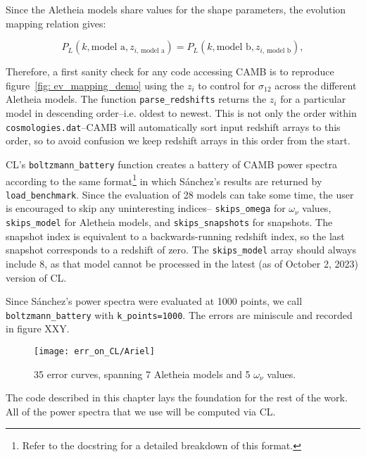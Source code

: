 Since the Aletheia models share values for the shape parameters, the
evolution mapping relation gives:

\begin{equation}
P_L(k, \text{model a}, z_{i, \, \text{model a}})
=
P_L(k, \text{model b}, z_{i, \, \text{model b}})
,\end{equation}

Therefore, a first sanity check for any code accessing CAMB is to reproduce
figure~\ref{fig: ev_mapping_demo} using the $z_i$ to control for $\sigma_{12}$
across the different Aletheia models. The function \verb|parse_redshifts|
returns the $z_i$ for a particular model in descending order--i.e. oldest
to newest. This is not only the order within \verb|cosmologies.dat|--CAMB
will automatically sort input redshift arrays to this order, so to avoid
confusion we keep redshift arrays in this order from the start.

CL's \verb|boltzmann_battery| function creates a battery of CAMB power
spectra according to the same
format\footnote{Refer to the docstring for a detailed breakdown of this
format.} in which S\'{a}nchez's results are
returned by \verb|load_benchmark|. Since the evaluation of 28 models can take
some time, the user is encouraged to skip any uninteresting indices--
\verb|skips_omega| for $\omega_\nu$ values, \verb|skips_model| for
Aletheia models, and \verb|skips_snapshots| for snapshots. The snapshot index
is equivalent to a backwards-running redshift index, so the last snapshot
corresponds to a redshift of zero. The \verb|skips_model| array should always
include 8, as that model cannot be processed in the latest (as of October 2,
2023) version of CL.

Since S\'{a}nchez's power spectra were evaluated at 1000 points, we call
\\
\verb|boltzmann_battery| with \verb|k_points=1000|. The errors are miniscule 
and recorded in figure XXY. 

\begin{figure}[ht!]
  \centering
  \texttt{[image: err\_on\_CL/Ariel]}
  \caption[CL Consistency]{35 error curves, spanning
  	7 Aletheia models and 5 $\omega_\nu$ values.}
  \label{fig: Ariel_errs}
\end{figure}

The code described in this chapter lays the foundation for the rest of the
work. All of the power spectra that we use will be computed via CL.



